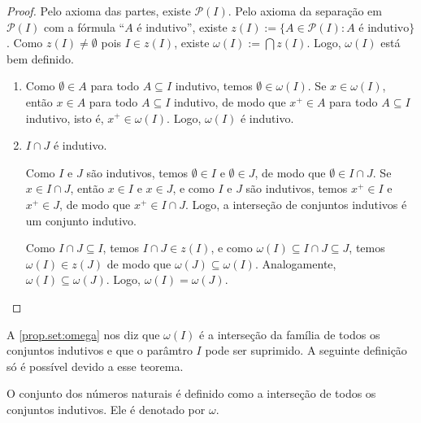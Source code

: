 \begin{proof} 
    Pelo axioma das partes, existe $\mathcal{P}{(I)}$. Pelo axioma da separação em $\mathcal{P}{(I)}$ com a fórmula ``$A$ é indutivo'', existe $z(I) :=  \{A \in \mathcal{P}{(I)} : A \text{ é indutivo} \}$. Como $z(I) \neq \emptyset$ pois $I \in z(I)$, existe $\omega(I) := \bigcap z(I)$. Logo, $\omega(I)$ está bem definido.
        \begin{enumerate}[leftmargin=*, align=left, label=\textbf{(\alph*)}]
            \item Como $\emptyset \in A$ para todo $A \subseteq I$ indutivo, temos $\emptyset \in \omega(I)$. Se $x \in \omega(I)$, então $x \in A$ para todo $A \subseteq I$ indutivo, de modo que $x^+ \in A$ para todo $A \subseteq I$ indutivo, isto é, $x^+ \in \omega(I)$. Logo, $\omega(I)$ é indutivo. \blackproof
            \item 
                \begin{claim}
                    $I \cap J$ é indutivo.
                \end{claim}
                \begin{midproof}
                    Como $I$ e $J$ são indutivos, temos $\emptyset \in I$ e $\emptyset \in J$, de modo que $\emptyset \in I \cap J$. Se $x \in I \cap J$, então $x \in I$ e $x \in J$, e como $I$ e $J$ são indutivos, temos $x^+ \in I$ e $x^+ \in J$, de modo que $x^+ \in I \cap J$. Logo, a interseção de conjuntos indutivos é um conjunto indutivo.  
                    \whiteproof
                \end{midproof}
            Como $I \cap J \subseteq I$, temos $I \cap J \in z(I)$, e como $\omega(I) \subseteq I \cap J \subseteq J$, temos $\omega(I) \in z(J)$ de modo que $\omega(J) \subseteq \omega(I)$. Analogamente, $\omega(I) \subseteq \omega(J)$. Logo, $\omega(I) = \omega(J)$. \blackproof
        \end{enumerate}
\end{proof}

\begin{remark}
    A \cref{prop.set:omega} nos diz que $\omega(I)$ é a interseção da família de todos os conjuntos indutivos e que o parâmtro $I$ pode ser suprimido. A seguinte definição só é possível devido a esse teorema.
\end{remark}

\begin{definition}
    O conjunto dos números naturais é definido como a interseção de todos os conjuntos indutivos. Ele é denotado por $\omega$.
\end{definition}

